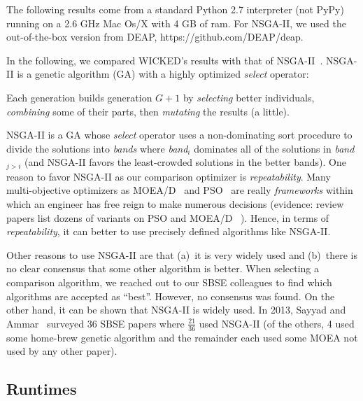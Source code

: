 

The following results come  from a standard Python 2.7 interpreter
(not PyPy) running on a 2.6 GHz Mac Os/X with 4 GB of ram.
For NSGA-II,
we used the out-of-the-box version from DEAP, https://github.com/DEAP/deap.


In the following, we compared WICKED's results with
that of NSGA-II~\cite{deb00}.  NSGA-II is a genetic
algorithm (GA) with a highly optimized {\em select}
operator: \bi
\item Each generation builds generation $G+1$ by {\em selecting} better
individuals, {\em combining} some of their parts, then 
{\em mutating} the results 
(a little).
\item NSGA-II is a GA whose {\em select} operator 
uses a non-dominating sort
procedure to divide the solutions into {\em bands}
where {\em band}$_i$ dominates all of the solutions
in {\em band}$_{j>i}$ (and NSGA-II favors the
least-crowded solutions in the better bands).
\ei
One reason to favor NSGA-II as our comparison optimizer is 
 {\em repeatability}. 
Many multi-objective optimizers as MOEA/D~\cite{zhang07} 
and PSO~\cite{Poli07particleswarm}
are really {\em frameworks} within 
which an engineer has free reign to make numerous decisions
(evidence: review papers list dozens of variants on  PSO and MOEA/D ~\cite{V.Sedenka2010,5601760}).
Hence, in terms of {\em repeatability}, it can better to use precisely defined algorithms like NSGA-II.

Other reasons to use NSGA-II are that (a)~it is very widely used 
and (b)~there is no clear
consensus that some other algorithm is better.
When selecting a comparison algorithm,
we reached out to our SBSE colleagues to
find
which algorithms are accepted as ``best''.  However, no consensus was found.
On the other hand, it can be shown that NSGA-II is widely used.
In 2013, Sayyad and Ammar~\cite{sayyad13c} surveyed 36 SBSE papers where $\frac{21}{36}$
used NSGA-II  (of the others, 4 used some home-brew genetic algorithm and the remainder
each used some MOEA not used by any other paper).


\subsection{Runtimes}

